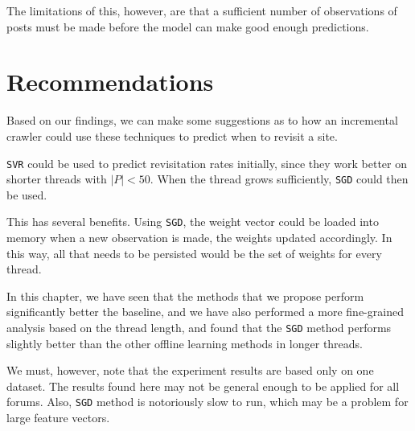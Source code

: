 The limitations of this, however, are that a sufficient number of observations 
of posts must be made before the model can make good enough predictions.

\section{Recommendations}
Based on our findings, we can make some suggestions as to how an incremental 
crawler could use these techniques to predict when to revisit a site.

\texttt{SVR} could be used to predict revisitation rates initially, since they 
work better on shorter threads with $|P| < 50$. When the thread grows 
sufficiently, \texttt{SGD} could then be used.

This has several benefits.
Using \texttt{SGD}, the weight vector could be loaded into memory when a new 
observation is made, the weights updated accordingly. In this way, all that 
needs to be persisted would be the set of weights for every thread.

In this chapter, we have seen that the methods that we propose perform 
significantly better the baseline, and we have also performed a more 
fine-grained analysis based on the thread length, and found that the 
\texttt{SGD} method performs slightly better than the other offline learning 
methods in longer threads.

We must, however, note that the experiment results are based only on one 
dataset. The results found here may not be general enough to be applied for all 
forums. Also, \texttt{SGD} method is notoriously slow to run, which may be a 
problem for large feature vectors.
